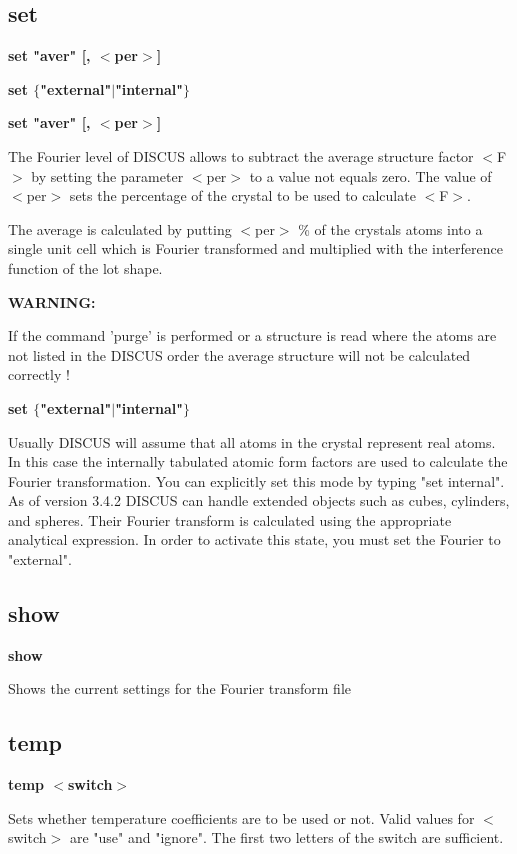 \subsection*{set}
{\bf set "aver" [, $ <$per$> $] \par }
{\bf set $ \{$"external"$| $"internal"$\} $ \par }
\par
{\bf set "aver" [, $ <$per$> $] \par }
\par
\vspace{3pt}
The Fourier level of DISCUS allows to subtract the average structure 
factor $ <$F$> $ by setting the parameter $ <$per$> $ to a value not equals zero. 
The value of $ <$per$> $ sets the percentage of the crystal to be used to 
calculate $ <$F$> $. 
\par
The average is calculated by putting $ <$per$> $ \% of the crystals atoms 
into a single unit cell which is Fourier transformed and multiplied 
with the interference function of the lot shape. 
\par
{\bf WARNING: \par }
\vspace{3pt}
If the command 'purge' is performed or a structure is read where the 
atoms are not listed in the DISCUS order the average structure will 
not be calculated correctly ! 
\par
{\bf set $ \{$"external"$| $"internal"$\} $ \par }
\par
\vspace{3pt}
Usually DISCUS will assume that all atoms in the crystal represent 
real atoms. In this case the internally tabulated atomic form factors 
are used to calculate the Fourier transformation. You can explicitly 
set this mode by typing "set internal". 
As of version 3.4.2 DISCUS can handle extended objects such as 
cubes, cylinders, and spheres. Their Fourier transform is calculated 
using the appropriate analytical expression. In order to activate 
this state, you must set the Fourier to "external". 
\subsection*{show}
{\bf show \par }
\par
\vspace{3pt}
Shows the current settings for the Fourier transform file 
\subsection*{temp}
{\bf temp $ <$switch$> $ \par }
\par
\vspace{3pt}
Sets whether temperature coefficients are to be used or not. 
Valid values for $ <$switch$> $ are "use" and "ignore". The first 
two letters of the switch are sufficient. 
